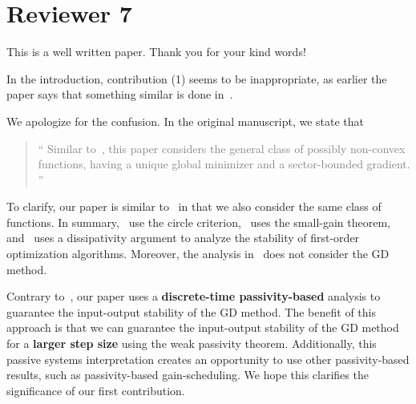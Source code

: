 \section*{Reviewer 7}\label{sec:reviewer7}
\renewcommand{\theequation}{R7.\arabic{equation}}
\setcounter{equation}{0}
\begin{rebuttal}[resolved]
    {%
        This is a well written paper.
    }%
    {%
        Thank you for your kind words!
    }%
\end{rebuttal}
\begin{rebuttal}[resolved]
    {%
        In the introduction, contribution (1) seems to be inappropriate, as earlier the paper says that something similar is done in~\cite{ugrinovskii,alex_petersen,hu_lessard,lessard_dissipativity}.
    }%
    {%
        We apologize for the confusion. In the original manuscript, we state that 
        \begin{quote}\textcolor{gray}{\enquote{%
            Similar to~\cite{ugrinovskii,alex_petersen,hu_lessard,lessard_dissipativity}, this paper considers the general class of possibly non-convex functions, having a unique global minimizer and a sector-bounded gradient.%
            }}%
        \end{quote}
        To clarify, our paper is similar to~\cite{ugrinovskii,alex_petersen,hu_lessard,lessard_dissipativity} in that we also consider the same class of functions. In summary,~\cite{ugrinovskii,alex_petersen} use the circle criterion,~\cite{hu_lessard} uses the small-gain theorem, and~\cite{lessard_dissipativity} uses a dissipativity argument to analyze the stability of first-order optimization algorithms. Moreover, the analysis in~\cite{ugrinovskii,alex_petersen} does not consider the GD method. 
        
        Contrary to~\cite{ugrinovskii,alex_petersen,hu_lessard,lessard_dissipativity}, our paper uses a \textbf{discrete-time passivity-based} analysis to guarantee the input-output stability of the GD method. The benefit of this approach is that we can guarantee the input-output stability of the GD method for a \textbf{larger step size} using the weak passivity theorem. Additionally, this passive systems interpretation creates an opportunity to use other passivity-based results, such as passivity-based gain-scheduling. We hope this clarifies the significance of our first contribution.
    }%
\end{rebuttal}
